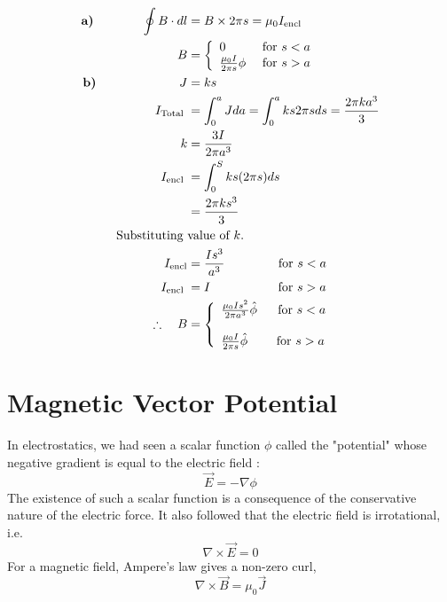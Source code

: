 \begin{answer}
	\begin{align*}
	\textbf{a)}\hspace{1cm}\quad\oint B \cdot d l&=B \times 2 \pi s=\mu_{0} I_{\text {encl }}\\
	B&=\left\{\begin{array}{ll}0 & \text { for } s<a \\ \frac{\mu _0 I}{2 \pi s} \phi & \text { for } s>a\end{array}\right.\\
	\textbf{b)}\hspace{2cm}\quad J&=k s\\
	I_{\text {Total }}&=\int_{0}^{a} J d a=\int_{0}^{a} k s 2 \pi s d s=\frac{2 \pi k a^{3}}{3}\\
	k&=\frac{3 I}{2 \pi a^{3}}\\
	I_{\text {encl }}&=\int_{0}^{S} k s(2 \pi s) d s\\
	&=\frac{2 \pi k s^{3}}{3}\\
	\text{Substituting }&\text{value of $k$.}\\
	I_{\text{encl}} &=\frac{I s^{3}}{a^{3}}\hspace{1.4cm}\text{ for } s<a\\
	I_{\text {encl }}&=I \hspace{1.8cm}\text{ for } s>a\\
	\therefore \quad B&=\left\{\begin{array}{l}\frac{\mu_{0} I s^{2}}{2 \pi a^{3}} \hat{\phi}\ \quad \text { for } s<a \\\\ \frac{\mu_{0} I}{2\pi s} \hat{\phi}\qquad \text { for } s>a\end{array}\right.
	\end{align*}
\end{answer}
\section{Magnetic Vector Potential}
In electrostatics, we had seen  a scalar function $\phi$ called the "potential"
whose negative gradient is equal to the electric field : 
\begin{equation*}
\vec{E}=-\nabla \phi
\end{equation*}
 The existence of such a scalar function is a consequence of the conservative nature of the electric force. It also followed that the electric field is irrotational, i.e.
 \begin{equation*}
\nabla \times \vec{E}=0
 \end{equation*}
For a magnetic field, Ampere's law gives a non-zero curl,
\begin{equation*}
\nabla\times \vec{B}=\mu_{0} \vec{J}
\end{equation*}

